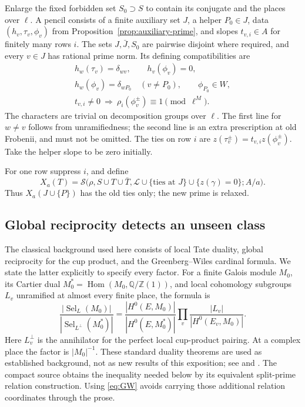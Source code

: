 \documentclass[11pt,a4paper]{article}
\theoremstyle{definition}
\newcommand{\Q}{\mathbb Q}
\newcommand{\Z}{\mathbb Z}
\begin{document}
Enlarge the fixed forbidden set \(S_0\supset S\) to contain
its conjugate and the places over \(\ell\).
A pencil consists of a finite auxiliary set \(J\), a helper
\(P_0\in J\), data \((h_v,\tau_v,\phi_v)\) from
Proposition~\ref{prop:auxiliary-prime}, and slopes
\(t_{v,i}\in A\) for finitely many rows \(i\).
The sets \(J,\bar J,S_0\) are pairwise disjoint where
required, and every \(v\in J\) has rational prime norm.
Its defining compatibilities are
\begin{equation}\label{eq:pencil}
 \begin{gathered}
 h_w(\tau_v)=\delta_{wv},\qquad h_v(\phi_v)=0,\\
 h_w(\phi_v)=\delta_{wP_0}\quad(v\ne P_0),\qquad
 \phi_{P_0}\in W,\\
 t_{v,i}\ne0\ \Longrightarrow\
       \rho_i(\phi_v^\pm)\equiv1\pmod{\ell^M}.
 \end{gathered}
\end{equation}
The characters are trivial on decomposition groups over
\(\ell\). The first line for \(w\ne v\) follows from
unramifiedness; the second line is an extra prescription
at old Frobenii, and must not be omitted.
The ties on row \(i\) are
\(z(\tau_v^\pm)=t_{v,i}z(\phi_v^\pm)\).
Take the helper slope to be zero initially.

For one row suppress \(i\), and define
\[
 X_a(T)=\mathcal S\bigl(\rho,S\cup T\cup\bar T,
       \mathcal L\cup\{\text{ties at }J\}\cup\{z(\gamma)=0\};
       A/a\bigr).
\]
Thus \(X_a(J\cup\{P\})\) has the old ties only;
the new prime is relaxed.

\subsection{Global reciprocity detects an unseen class}
The classical background used here consists of local Tate
duality, global reciprocity for the cup product, and the
Greenberg--Wiles cardinal formula. We state the latter
explicitly to specify every factor. For a finite Galois
module \(M_0\), its Cartier dual
\(M_0^*=\operatorname{Hom}(M_0,\Q/\Z(1))\), and local
cohomology subgroups \(L_v\) unramified at almost every
finite place, the formula is
\begin{equation}\label{eq:GW}
 \frac{|\operatorname{Sel}_{L}(M_0)|}
      {|\operatorname{Sel}_{L^\perp}(M_0^*)|}
 =\frac{|H^0(E,M_0)|}{|H^0(E,M_0^*)|}
      \prod_v\frac{|L_v|}{|H^0(E_v,M_0)|}.
\end{equation}
Here \(L_v^\perp\) is the annihilator for the perfect local
cup-product pairing. At a complex place the factor is
\(|M_0|^{-1}\). These standard duality theorems are used
as established background, not as new results of this
exposition; see \cite[Theorem 1.8]{smithGW} and \cite{milneADT}.
The compact source obtains the inequality needed below
by its equivalent split-prime relation construction.
Using \eqref{eq:GW} avoids carrying those additional
relation coordinates through the prose.
\end{document}
